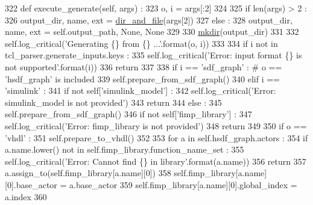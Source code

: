 \begin{DoxyCode}
322   \textcolor{keyword}{def }execute\_generate(self, args) :
323     o, i = args[:2]
324 
325     \textcolor{keywordflow}{if} len(args) > 2 :
326       output\_dir, name, ext = \hyperlink{namespacesylva_1_1misc_1_1util_a0ce6d1d719234031353b60ac60f2af0d}{dir\_and\_file}(args[2])
327     \textcolor{keywordflow}{else} :
328       output\_dir, name, ext = self.output\_path, \textcolor{keywordtype}{None}, \textcolor{keywordtype}{None}
329 
330     \hyperlink{namespacesylva_1_1misc_1_1util_af426e429c40209bbb46e3a0e8f139a44}{mkdir}(output\_dir)
331 
332     self.log\_critical(\textcolor{stringliteral}{'Generating \{\} from \{\} ...'}.format(o, i))
333 
334     \textcolor{keywordflow}{if} i \textcolor{keywordflow}{not} \textcolor{keywordflow}{in} tcl\_parser.generate\_inputs.keys :
335       self.log\_critical(\textcolor{stringliteral}{'Error: input format \{\} is not supported'}.format(i))
336       \textcolor{keywordflow}{return}
337 
338     \textcolor{keywordflow}{if} i == \textcolor{stringliteral}{'sdf\_graph'} : \textcolor{comment}{# o == 'hsdf\_graph' is included}
339       self.prepare\_from\_sdf\_graph()
340     \textcolor{keywordflow}{elif} i == \textcolor{stringliteral}{'simulink'} :
341       \textcolor{keywordflow}{if} \textcolor{keywordflow}{not} self[\textcolor{stringliteral}{'simulink\_model'}] :
342         self.log\_critical(\textcolor{stringliteral}{'Error: simulink\_model is not provided'})
343         \textcolor{keywordflow}{return}
344       \textcolor{keywordflow}{else} :
345         self.prepare\_from\_sdf\_graph()
346       \textcolor{keywordflow}{if} \textcolor{keywordflow}{not} self[\textcolor{stringliteral}{'fimp\_library'}] :
347         self.log\_critical(\textcolor{stringliteral}{'Error: fimp\_library is not provided'})
348         \textcolor{keywordflow}{return}
349 
350     \textcolor{keywordflow}{if} o == \textcolor{stringliteral}{'vhdl'} :
351       self.prepare\_to\_vhdl()
352 
353       \textcolor{keywordflow}{for} a \textcolor{keywordflow}{in} self.hsdf\_graph.actors :
354         \textcolor{keywordflow}{if} a.name.lower() \textcolor{keywordflow}{not} \textcolor{keywordflow}{in} self.fimp\_library.function\_name\_set :
355           self.log\_critical(\textcolor{stringliteral}{'Error: Cannot find \{\} in library'}.format(a.name))
356           \textcolor{keywordflow}{return}
357         a.assign\_to(self.fimp\_library[a.name][0])
358         self.fimp\_library[a.name][0].base\_actor = a.base\_actor
359         self.fimp\_library[a.name][0].global\_index = a.index
360 

\end{DoxyCode}
